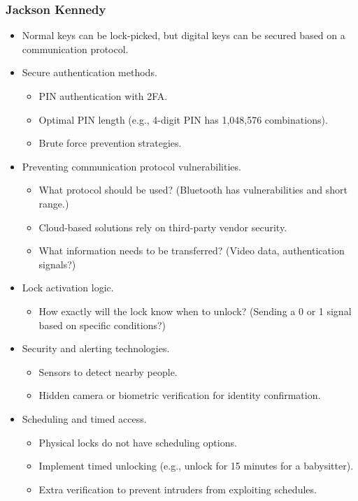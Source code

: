 \subsubsection*{Jackson Kennedy}
\begin{itemize}
    \item Normal keys can be lock-picked, but digital keys can be secured based on a communication protocol.
    \item Secure authentication methods.
    \begin{itemize}
        \item PIN authentication with 2FA.
        \item Optimal PIN length (e.g., 4-digit PIN has 1,048,576 combinations).
        \item Brute force prevention strategies.
    \end{itemize}
    \item Preventing communication protocol vulnerabilities.
    \begin{itemize}
        \item What protocol should be used? (Bluetooth has vulnerabilities and short range.)
        \item Cloud-based solutions rely on third-party vendor security.
        \item What information needs to be transferred? (Video data, authentication signals?)
    \end{itemize}
    \item Lock activation logic.
    \begin{itemize}
        \item How exactly will the lock know when to unlock? (Sending a 0 or 1 signal based on specific conditions?)
    \end{itemize}
    \item Security and alerting technologies.
    \begin{itemize}
        \item Sensors to detect nearby people.
        \item Hidden camera or biometric verification for identity confirmation.
    \end{itemize}
    \item Scheduling and timed access.
    \begin{itemize}
        \item Physical locks do not have scheduling options.
        \item Implement timed unlocking (e.g., unlock for 15 minutes for a babysitter).
        \item Extra verification to prevent intruders from exploiting schedules.
    \end{itemize}
\end{itemize}
\newpage









